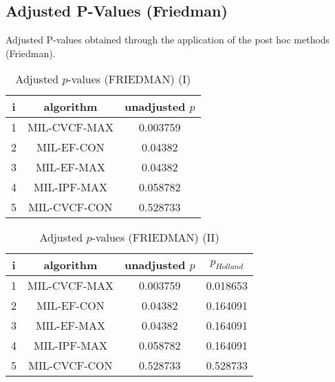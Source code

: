 \documentclass[a4paper,10pt]{article}
\begin{document}
\begin{landscape}
\newpage

\section{Adjusted P-Values (Friedman)}


Adjusted P-values obtained through the application of the post hoc methods (Friedman).

\begin{table}[!htp]
\centering\small
\begin{tabular}{ccc}
i&algorithm&unadjusted $p$\\
\hline1&MIL-CVCF-MAX&0.003759\\2&MIL-EF-CON&0.04382\\3&MIL-EF-MAX&0.04382\\4&MIL-IPF-MAX&0.058782\\5&MIL-CVCF-CON&0.528733\\\hline
\end{tabular}
\caption{Adjusted $p$-values (FRIEDMAN) (I)}
\end{table}
\begin{table}[!htp]
\centering\small
\begin{tabular}{cccc}
i&algorithm&unadjusted $p$&$p_{Holland}$\\
\hline1&MIL-CVCF-MAX&0.003759&0.018653\\2&MIL-EF-CON&0.04382&0.164091\\3&MIL-EF-MAX&0.04382&0.164091\\4&MIL-IPF-MAX&0.058782&0.164091\\5&MIL-CVCF-CON&0.528733&0.528733\\\hline
\end{tabular}
\caption{Adjusted $p$-values (FRIEDMAN) (II)}
\end{table}

\newpage
\end{landscape}
\end{document}
